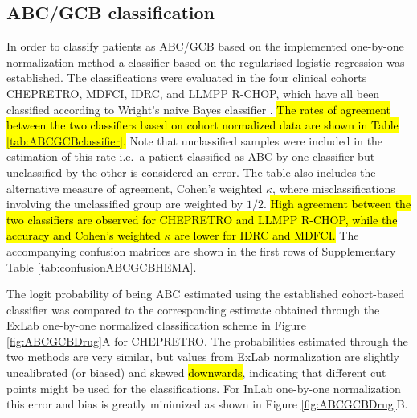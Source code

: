 \documentclass{article}
\begin{document}
\subsection{ABC/GCB classification}
In order to classify patients as ABC/GCB based on the implemented one-by-one normalization method a classifier based on the regularised logistic regression was established.
The classifications were evaluated in the four clinical cohorts CHEPRETRO, MDFCI, IDRC, and LLMPP R-CHOP, which have all been classified according to Wright's naive Bayes classifier \citep{DybkaerBoegsted2015,Wright2003,Lenz2008a}.
\hl{The rates of agreement between the two classifiers based on cohort normalized data are shown in Table \mbox{\ref{tab:ABCGCBclassifier}}.}
Note that unclassified samples were included in the estimation of this rate i.e.\ a patient classified as ABC by one classifier but unclassified by the other is considered an error.
The table also includes the alternative measure of agreement, Cohen's weighted $\kappa$, where misclassifications involving the unclassified group are weighted by $1/2$. \hl{High agreement between the two classifiers are observed for CHEPRETRO and LLMPP R-CHOP, while the accuracy and Cohen's weighted $\kappa$ are lower for IDRC and MDFCI.}
The accompanying confusion matrices are shown in the first rows of Supplementary Table \ref{tab:confusionABCGCBHEMA}.

The logit probability of being ABC estimated using the established cohort-based classifier was compared to the corresponding estimate obtained through the ExLab one-by-one normalized classification scheme in Figure \ref{fig:ABCGCBDrug}A for CHEPRETRO.
The probabilities estimated through the two methods are very similar, but
values from ExLab normalization are slightly uncalibrated (or biased) and skewed \hl{downwards}, indicating that different cut points might be used for the classifications.
For InLab one-by-one normalization this error and bias is greatly minimized as shown in Figure \ref{fig:ABCGCBDrug}B.
\end{document}
